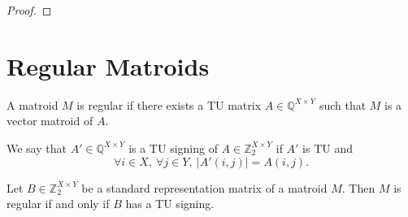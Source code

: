 \begin{proof}
    \leanok
    \SeeLean
\end{proof}


\section{Regular Matroids}

\begin{definition}
    \label{Matroid.IsRegular}
    \leanok
    A matroid $M$ is regular if there exists a TU matrix $A \in \mathbb{Q}^{X \times Y}$ such that $M$ is a vector matroid of $A$.
\end{definition}

\begin{definition}
    \label{Matrix.IsTuSigningOf}
    \leanok
    We say that $A' \in \mathbb{Q}^{X \times Y}$ is a TU signing of $A \in \mathbb{Z}_{2}^{X \times Y}$ if $A'$ is TU and
    \[
        \forall i \in X, \ \forall j \in Y, \ |A' (i, j)| = A (i, j).
    \]
\end{definition}

\begin{lemma}
    \label{StandardRepr.toMatroid_isRegular_iff_hasTuSigning}
    \leanok
    Let $B \in \mathbb{Z}_{2}^{X \times Y}$ be a standard representation matrix of a matroid $M$. Then $M$ is regular if and only if $B$ has a TU signing.
\end{lemma}

